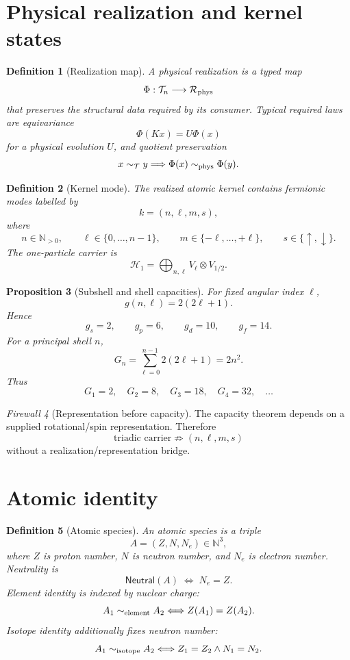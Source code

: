\documentclass[11pt,a4paper]{article}
\newtheorem{definition}{Definition}[section]
\newtheorem{proposition}[definition]{Proposition}
\theoremstyle{remark}
\newtheorem{firewall}[definition]{Firewall}
\newcommand{\T}{\mathcal T}
\newcommand{\Hone}{\mathcal H_1}
\newcommand{\Nat}{\mathbb N}
\newcommand{\Rphys}{\mathcal R_{\rm phys}}
\begin{document}
\section{Physical realization and kernel states}

\begin{definition}[Realization map]
A physical realization is a typed map
\[
 \Phi:\T_n\longrightarrow \Rphys
\]
that preserves the structural data required by its consumer.  Typical required
laws are equivariance
\[
 \Phi(Kx)=U\Phi(x)
\]
for a physical evolution $U$, and quotient preservation
\[
 x\sim_{\T}y \Longrightarrow \Phi(x)\sim_{\rm phys}\Phi(y).
\]
\end{definition}

\begin{definition}[Kernel mode]
The realized atomic kernel contains fermionic modes labelled by
\[
 k=(n,\ell,m,s),
\]
where
\[
 n\in\Nat_{>0},\qquad \ell\in\{0,\ldots,n-1\},\qquad
 m\in\{-\ell,\ldots,+\ell\},\qquad s\in\{\uparrow,\downarrow\}.
\]
The one-particle carrier is
\[
 \Hone = \bigoplus_{n,\ell} V_\ell\otimes V_{1/2}.
\]
\end{definition}

\begin{proposition}[Subshell and shell capacities]
For fixed angular index $\ell$,
\[
 g(n,\ell)=2(2\ell+1).
\]
Hence
\[
 g_s=2,\qquad g_p=6,
\qquad g_d=10,
\qquad g_f=14.
\]
For a principal shell $n$,
\[
 G_n = \sum_{\ell=0}^{n-1}2(2\ell+1)=2n^2.
\]
Thus
\[
 G_1=2,
\quad G_2=8,
\quad G_3=18,
\quad G_4=32,
\quad \ldots
\]
\end{proposition}

\begin{firewall}[Representation before capacity]
The capacity theorem depends on a supplied rotational/spin representation.
Therefore
\[
\text{triadic carrier}\not\Rightarrow(n,\ell,m,s)
\]
without a realization/representation bridge.
\end{firewall}

\section{Atomic identity}

\begin{definition}[Atomic species]
An atomic species is a triple
\[
 A=(Z,N,N_e)\in\Nat^3,
\]
where $Z$ is proton number, $N$ is neutron number, and $N_e$ is electron number.
Neutrality is
\[
 \mathsf{Neutral}(A)\;\Longleftrightarrow\;N_e=Z.
\]
Element identity is indexed by nuclear charge:
\[
 A_1\sim_{\rm element}A_2 \Longleftrightarrow Z(A_1)=Z(A_2).
\]
Isotope identity additionally fixes neutron number:
\[
 A_1\sim_{\rm isotope}A_2 \Longleftrightarrow Z_1=Z_2\land N_1=N_2.
\]
\end{definition}
\end{document}
